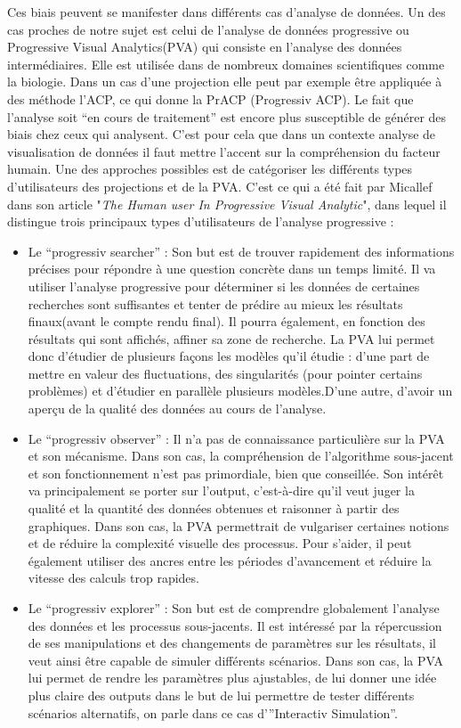 \smallskip
Ces biais peuvent se manifester dans différents cas d'analyse de données. 
Un des cas proches de notre sujet est celui de l’analyse de données progressive ou Progressive Visual Analytics(PVA)  qui consiste en l’analyse des données intermédiaires. Elle est utilisée dans de nombreux domaines scientifiques comme la biologie. Dans un cas d'une projection elle peut par exemple être appliquée à des méthode l’ACP, ce qui donne la PrACP (Progressiv ACP)\cite{PR-ACP}.
\smallskip
Le fait que l’analyse soit “en cours de traitement” est encore plus susceptible de générer des biais chez ceux qui analysent. 
C’est pour cela que dans un contexte analyse de visualisation de données il faut mettre l’accent sur la compréhension du facteur humain. 
Une des approches possibles est de catégoriser les différents types d’utilisateurs des projections et de la PVA. C’est ce qui a été fait par Micallef dans son article "\textit{The Human user In Progressive Visual Analytic}"\cite{micallef2019HumanProgressiv}, dans lequel il distingue trois principaux types d'utilisateurs de l'analyse progressive :

\begin{itemize}
    \item Le “progressiv searcher” : 
    Son but est de trouver rapidement des informations précises pour répondre à une question concrète dans un temps limité. Il va utiliser l’analyse progressive pour déterminer si les données de certaines recherches sont suffisantes et tenter de prédire au mieux les résultats finaux(avant le compte rendu final). Il pourra également, en fonction des résultats qui sont affichés, affiner sa zone de recherche. La PVA lui permet donc d’étudier de plusieurs façons les modèles qu’il étudie : d’une part de mettre en valeur des fluctuations, des singularités (pour pointer certains problèmes) et d’étudier en parallèle plusieurs modèles.D’une autre, d’avoir un aperçu de la qualité des données au cours de l’analyse.
    \item Le “progressiv observer” : 
    Il n’a pas de connaissance particulière sur la PVA et son mécanisme. Dans son cas, la compréhension de l’algorithme sous-jacent et son fonctionnement n'est pas primordiale, bien que conseillée.
    Son intérêt va principalement se porter sur l’output, c'est-à-dire qu’il veut juger la qualité et la quantité des données obtenues et raisonner à partir des graphiques. Dans son cas, la PVA permettrait de vulgariser certaines notions et de réduire la complexité visuelle des processus. Pour s’aider, il peut également utiliser des ancres entre les périodes d’avancement et réduire la vitesse des calculs trop rapides.
    \item Le “progressiv explorer” :  
    Son but est de comprendre globalement l’analyse des données et les processus sous-jacents. Il est intéressé par la répercussion de ses manipulations et des changements de paramètres sur les résultats, il veut ainsi être capable de simuler différents scénarios. Dans son cas, la PVA lui permet de rendre les paramètres plus ajustables, de lui donner une idée plus claire des outputs dans le but de lui permettre de tester différents scénarios alternatifs, on parle dans ce cas d’”Interactiv Simulation”.            
\end{itemize}

